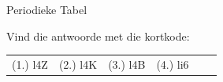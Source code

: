 \begin{eocexercises}{ Periodieke Tabel}
\begin{enumerate}[noitemsep, label=\textbf{\arabic*}. ]
\end{enumerate}
  \label{4e3d8e3d8992782b4e5d6fd958df32f9**end}
\par {} Vind die antwoorde met die kortkode:
 \par \begin{tabular}[h]{cccccc}
 (1.) l4Z  &  (2.) l4K  &  (3.) l4B  &  (4.) li6  & \end{tabular}
\end{eocexercises}
